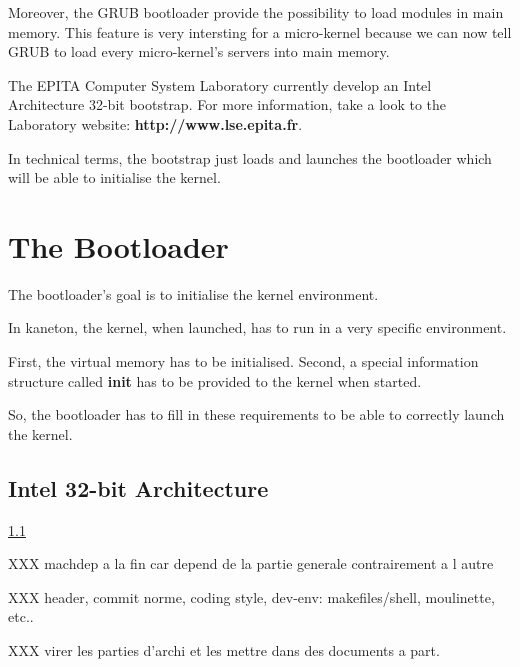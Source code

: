 Moreover, the GRUB bootloader provide the possibility to load
modules in main memory. This feature is very intersting for a micro-kernel
because we can now tell GRUB to load every micro-kernel's servers into
main memory.

The EPITA Computer System Laboratory currently develop an Intel Architecture
32-bit bootstrap. For more information, take a look to the Laboratory
website: \textbf{http://www.lse.epita.fr}.

In technical terms, the bootstrap just loads and launches the bootloader
which will be able to initialise the kernel.



\section{The Bootloader}

The bootloader's goal is to initialise the kernel environment.

In kaneton, the kernel, when launched, has to run in a very specific
environment.

First, the virtual memory has to be initialised. Second, a special
information structure called \textbf{init} has to be provided to
the kernel when started.

So, the bootloader has to fill in these requirements to be able
to correctly launch the kernel.

\subsection{Intel 32-bit Architecture}


\label{}
\ref{}
\pageref{}

XXX machdep a la fin car depend de la partie generale contrairement a l autre

XXX header, commit norme, coding style, dev-env: makefiles/shell, moulinette,
    etc..

XXX virer les parties d'archi et les mettre dans des documents a part.
